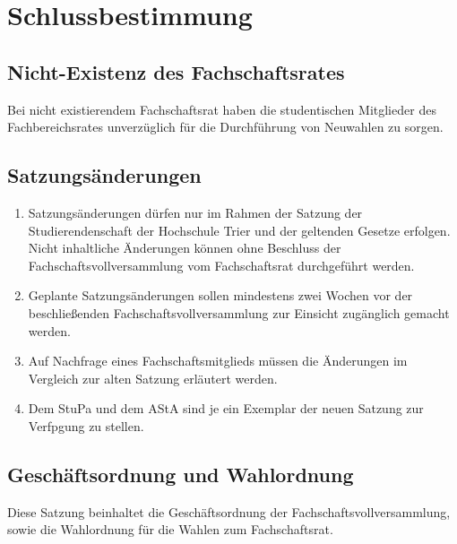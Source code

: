 \section{Schlussbestimmung}
\subsection{Nicht-Existenz des Fachschaftsrates}
Bei nicht existierendem Fachschaftsrat haben die studentischen Mitglieder des Fachbereichsrates unverzüglich für die Durchführung von Neuwahlen zu sorgen.

\subsection{Satzungsänderungen}
\begin{enumerate}
\item Satzungsänderungen dürfen nur im Rahmen der Satzung der Studierendenschaft der Hochschule Trier und der geltenden Gesetze erfolgen. Nicht inhaltliche Änderungen können ohne Beschluss der Fachschaftsvollversammlung vom Fachschaftsrat durchgeführt werden.
\item Geplante Satzungsänderungen sollen mindestens zwei Wochen vor der beschließenden Fachschaftsvollversammlung zur Einsicht zugänglich gemacht werden.
\item Auf Nachfrage eines Fachschaftsmitglieds müssen die Änderungen im Vergleich zur alten Satzung erläutert werden.
\item Dem StuPa und dem AStA sind je ein Exemplar der neuen Satzung zur Verfpgung zu stellen.
\end{enumerate}

\subsection{Geschäftsordnung und Wahlordnung}
Diese Satzung beinhaltet die Geschäftsordnung der Fachschaftsvollversammlung, sowie die Wahlordnung für die Wahlen zum Fachschaftsrat.
